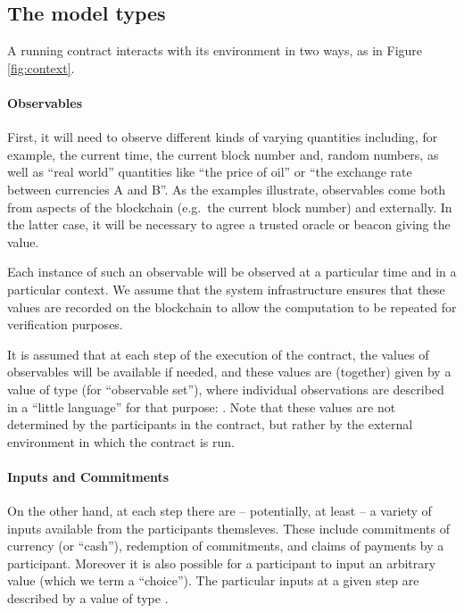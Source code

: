 \documentclass[runningheads]{llncs}
\begin{document}
\subsection{The model types}

A running contract interacts with its environment in two ways, as in Figure \ref{fig:context}.

\paragraph{Observables}


First, it will need to observe different kinds of varying quantities including, for example, the current time, the 
current block number and, random numbers, as well as ``real world'' quantities like ``the price of oil'' or ``the 
exchange rate between currencies A and B''. 
As the examples illustrate, observables come both from aspects of the blockchain (e.g.\ the current block number) and 
externally. In the latter case, it will be necessary to agree a trusted oracle or beacon giving the value.


Each instance of such an observable will be observed at a particular time and in a particular context. We assume that the system infrastructure ensures that these values are recorded on the blockchain to 
allow the computation to be repeated for verification purposes. 


It is assumed that at each step of the execution of the 
contract, the values of observables will be available if needed, and these values are (together) given by a value of type 
 (for ``observable set''), where individual observations are described in a 
``little language'' for that purpose: . 
Note that these values are not determined by the participants in the contract, but rather by the 
external environment in which the contract is run.

 

\paragraph{Inputs and Commitments}


On the other hand, at each step there are -- potentially, at least -- a variety of inputs available from the 
participants themsleves. These include commitments of currency (or ``cash''), redemption of commitments, and claims of payments by 
a participant. Moreover it is also possible for a participant to input an arbitrary value (which we term a ``choice''). 
The particular inputs at a given step are described by a value of type .
\end{document}
